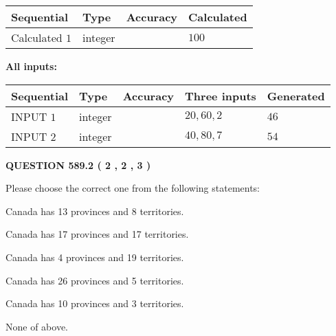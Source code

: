 \documentclass[12pt]{article}
\begin{document}
   
   
   
\noindent{}
   
   
  
  
\noindent\begin{tabular}{|l|l|l|l|}
\hline
 Sequential & Type & Accuracy & Calculated \\ 
\hline
 
 
  Calculated $  1 $ & integer &  & 
  $ 100 $ 
 \\  \hline  
 \end{tabular}
   
   
   
   
\noindent\vspace{0.1in}\hspace{-0.08in} {\textbf{\Large{All inputs: }}}
   
   
  
  
\noindent\begin{tabular}{|l|l|l|l|l|}
\hline
 Sequential & Type & Accuracy & Three inputs & Generated \\ 
\hline
 
 
  INPUT $  1 $ & integer &  & $
 20
 , 
 60
 , 
 2
 $ & $ 46 $ 
 \\  \hline  
 
 
  INPUT $  2 $ & integer &  & $
 40
 , 
 80
 , 
 7
 $ & $ 54 $ 
 \\  \hline  
 \end{tabular}
   
   
  
\vspace{0.2in}
  
{\textbf{\Large{QUESTION
589.2 
 ( 2 , 2 , 3 )
}}}
  
  
Please choose the correct one from the following statements:
 
 
Canada has  13 provinces and  8 territories.
 
 
Canada has  17 provinces and  17 territories.
 
 
Canada has   4 provinces and  19 territories.
 
 
Canada has  26 provinces and  5 territories.
 
 
Canada has 10  provinces and 3 territories.
 
 
 None of above.
 
\end{document}

